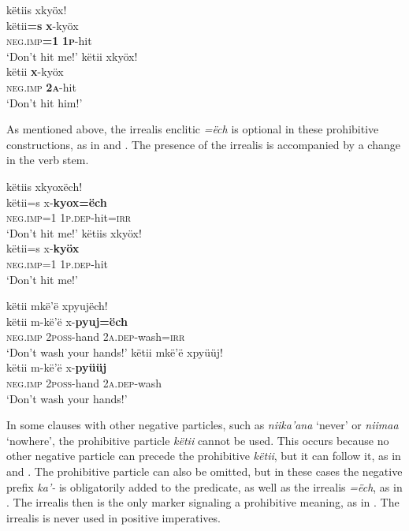 \documentclass[output=paper,colorlinks,citecolor=brown,draft]{langscibook}
\begin{document}
\ea\label{ex:mix:25}
    \ea\label{ex:mix:25a}
        \glll këtiis xkyöx! \\ 
             këtii\textbf{=s} \textbf{x}{}-kyöx \\
             \textsc{neg.imp}\textbf{=1} \textsc{\textbf{1p}}-hit \\
        \glt ‘Don’t hit me!’
    \ex\label{ex:mix:25b}
        \glll këtii xkyöx! \\
              këtii \textbf{x}{}-kyöx \\
              \textsc{neg.imp} \textbf{\textsc{2a}}-hit \\
        \glt ‘Don’t hit him!’
    \z
\z 

As mentioned above, the irrealis enclitic \textit{=ëch} is optional in these prohibitive constructions, as in  and . The presence of the irrealis is accompanied by a change in the verb stem. 

\ea\label{ex:mix:26}
    \ea\label{ex:mix:26a}
        \glll këtiis xkyoxëch!\\ 
              këtii=s x-\textbf{kyox=ëch} \\
              \textsc{neg.imp}=1 \textsc{1p.dep-}hit=\textsc{irr} \\
        \glt ‘Don’t hit me!’
    \ex\label{ex:mix:26b}
        \glll këtiis xkyöx! \\
              këtii=s x-\textbf{kyöx} \\
              \textsc{neg.imp}=1 \textsc{1p.dep-}hit \\
        \glt ‘Don’t hit me!’
    \z
\z 
 
\ea\label{ex:mix:27}
    \ea\label{ex:mix:27a}
        \glll këtii mkë’ë xpyujëch! \\ 
              këtii m-kë’ë x-\textbf{pyuj=ëch} \\
              \textsc{neg.imp} \textsc{2poss}{}-hand \textsc{2a.dep-}wash=\textsc{irr}\\
        \glt ‘Don’t wash your hands!’ 
    \ex\label{ex:mix:27b}
        \glll këtii mkë’ë xpyüüj!\\
              këtii m-kë’ë x-\textbf{pyüüj}\\
              \textsc{neg.imp} \textsc{2poss}{}-hand \textsc{2a.dep-}wash \\
        \glt ‘Don’t wash your hands!’
    \z
\z 

In some clauses with other negative particles, such as \textit{niika’ana} ‘never’ or \textit{niimaa} ‘nowhere’, the prohibitive particle \textit{këtii} cannot be used. This occurs because no other negative particle can precede the prohibitive \textit{këtii}, but it can follow it, as in  and . The prohibitive particle can also be omitted, but in these cases the negative prefix \textit{ka’-} is obligatorily added to the predicate, as well as the irrealis \textit{=ëch}, as in . The irrealis then is the only marker signaling a prohibitive meaning, as in . The irrealis is never used in positive imperatives.
\end{document}
